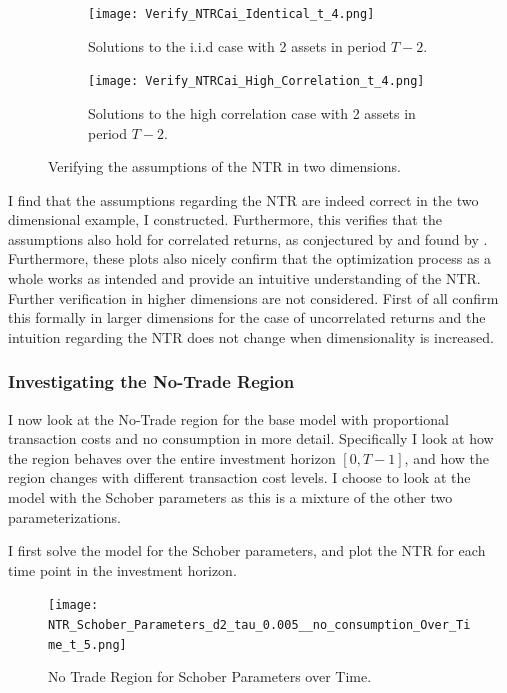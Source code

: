 \documentclass[11pt]{article}
\begin{document}
\begin{figure}[!ht]
    \centering
    \begin{subfigure}[t]{0.48\textwidth}
        \centering
        \texttt{[image: Verify\_NTRCai\_Identical\_t\_4.png]}
        \caption{Solutions to the i.i.d case with 2 assets in period $T-2$.}
        \label{fig:NTR_verify_iid}
    \end{subfigure}%
    \hfill
    \begin{subfigure}[t]{0.48\textwidth}
        \centering
        \texttt{[image: Verify\_NTRCai\_High\_Correlation\_t\_4.png]}
        \caption{Solutions to the high correlation case with 2 assets in period $T-2$.}
        \label{fig:NTR_verify_Correlation}
    \end{subfigure}

    \caption{Verifying the assumptions of the NTR in two dimensions.}
    \label{fig:NTR_Verify}
\end{figure}
I find that the assumptions regarding the \ac{NTR} are indeed correct in the two dimensional example, I constructed.
Furthermore, this verifies that the assumptions also hold for correlated returns, as conjectured by \autocite{liu2002} and found by \autocite{CaiJuddXu2013}.
Furthermore, these plots also nicely confirm that the optimization process as a whole works as intended and provide an intuitive understanding of the \ac{NTR}.
Further verification in higher dimensions are not considered. First of all \autocite{liu2002} confirm this formally in larger dimensions
for the case of uncorrelated returns and the intuition regarding the \ac{NTR} does not change when dimensionality is increased.

\subsubsection{Investigating the No-Trade Region} \label{Subsubsection: InvestigatingNTR}
I now look at the No-Trade region for the base model with proportional transaction costs and no consumption in more detail.
Specifically I look at how the region behaves over the entire investment horizon $[0, T-1]$, and how the region changes with different transaction cost levels.
I choose to look at the model with the Schober parameters as this is a mixture of the other two parameterizations.

I first solve the model for the Schober parameters, and plot the \ac{NTR} for each time point in the investment horizon.
\begin{figure}[!ht]
    \centering
    \texttt{[image: NTR\_Schober\_Parameters\_d2\_tau\_0.005\_\_no\_consumption\_Over\_Time\_t\_5.png]}
    \caption{No Trade Region for Schober Parameters over Time.}
    \label{fig:NTR_2d_iid_standalone}
\end{figure}
\end{document}
